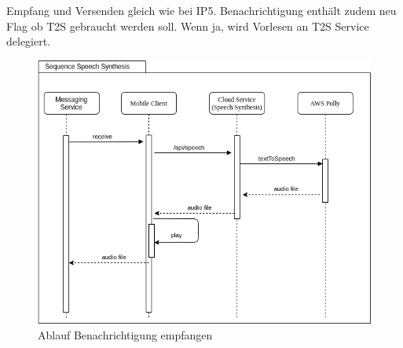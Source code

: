 Empfang und Versenden gleich wie bei IP5.
Benachrichtigung enthält zudem neu Flag ob T2S gebraucht werden soll.
Wenn ja, wird Vorlesen an T2S Service delegiert.

\begin{figure}[h]
    \centering
    \begin{minipage}[b]{0.9\textwidth}
        \includegraphics[width=\textwidth]{graphics/diagramms/Sequence_Speech_Synth_V01}
        \caption{Ablauf Benachrichtigung empfangen}
    \end{minipage}
\end{figure}

\clearpage
